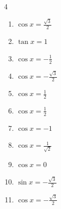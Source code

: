 \begin{multicols}{4}
\begin{enumerate}
  \item $\displaystyle \cos{x}  = \frac{\sqrt{3}}{2}$


  \item $\displaystyle \tan{x}  = 1$


  \item $\displaystyle \cos{x}  = -\frac{1}{2}$


  \item $\displaystyle \cos{x}  = -\frac{\sqrt{3}}{2}$


  \item $\displaystyle \cos{x}  = \frac{1}{2}$


  \item $\displaystyle \cos{x}  = \frac{1}{2}$


  \item $\displaystyle \cos{x}  = -1$

        \phantom{$\displaystyle x = \pi$}

  \item $\displaystyle \cos{x}  = \frac{1}{\sqrt{2}}$


\columnbreak %

  \item $\displaystyle \cos{x}  = 0$


  \item $\displaystyle \sin{x}  = -\frac{\sqrt{3}}{2}$


  \item $\displaystyle \cos{x}  = -\frac{\sqrt{3}}{2}$



\end{enumerate}
\end{multicols}
